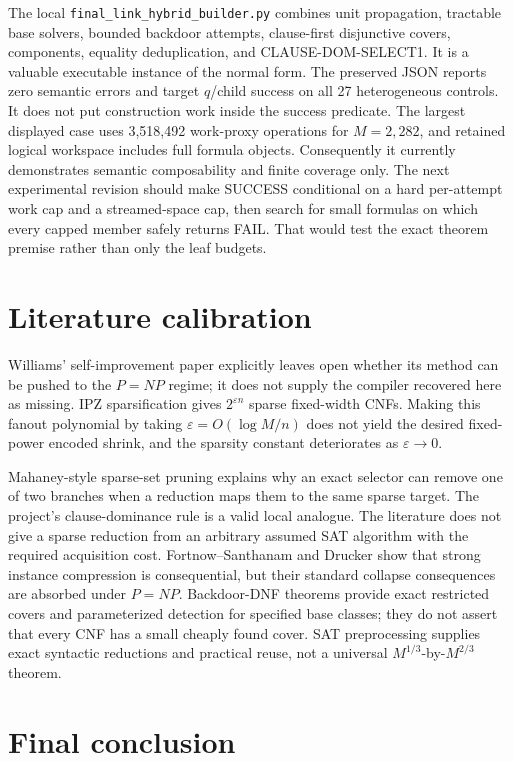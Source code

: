 \documentclass[10pt]{article}
\begin{document}
The local \texttt{final\_link\_hybrid\_builder.py} combines unit
propagation, tractable base solvers, bounded backdoor attempts, clause-first
disjunctive covers, components, equality deduplication, and
CLAUSE-DOM-SELECT1.  It is a valuable executable instance of the normal form.
The preserved JSON reports zero semantic errors and target $q$/child success
on all 27 heterogeneous controls.  It does not put construction work inside
the success predicate.  The largest displayed case uses 3,518,492 work-proxy
operations for $M=2,282$, and retained logical workspace includes full formula
objects.  Consequently it currently demonstrates semantic composability and
finite coverage only.  The next experimental revision should make SUCCESS
conditional on a hard per-attempt work cap and a streamed-space cap, then
search for small formulas on which every capped member safely returns FAIL.
That would test the exact theorem premise rather than only the leaf budgets.

\section{Literature calibration}

Williams' self-improvement paper explicitly leaves open whether its method can
be pushed to the $P=NP$ regime; it does not supply the compiler recovered here
as missing.  IPZ sparsification gives $2^{\varepsilon n}$ sparse fixed-width
CNFs.  Making this fanout polynomial by taking
$\varepsilon=O(\log M/n)$ does not yield the desired fixed-power encoded
shrink, and the sparsity constant deteriorates as $\varepsilon\to0$.

Mahaney-style sparse-set pruning explains why an exact selector can remove one
of two branches when a reduction maps them to the same sparse target.  The
project's clause-dominance rule is a valid local analogue.  The literature
does not give a sparse reduction from an arbitrary assumed SAT algorithm with
the required acquisition cost.  Fortnow--Santhanam and Drucker show that
strong instance compression is consequential, but their standard collapse
consequences are absorbed under $P=NP$.  Backdoor-DNF theorems provide exact
restricted covers and parameterized detection for specified base classes;
they do not assert that every CNF has a small cheaply found cover.  SAT
preprocessing supplies exact syntactic reductions and practical reuse, not a
universal $M^{1/3}$-by-$M^{2/3}$ theorem.

\section{Final conclusion}
\end{document}
